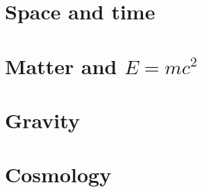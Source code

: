 \documentclass{poets}
\begin{document}
%






\tableofcontents

\mainmatter
  \addtocounter{page}{6}  %
\newcommand{\dochapter}[1]{\renewcommand{\chapdir}{ch#1}}
\part{Space and time}
    \dochapter{01}
    \dochapter{02}
    \dochapter{03}
    \dochapter{04}
\part{Matter and \boldmath $E=mc^2$}
    \dochapter{05}
    \dochapter{06}
\part{Gravity}
    \dochapter{07}
    \dochapter{08}
    \dochapter{09}
    \dochapter{10}
    \dochapter{11}
    \dochapter{12}
\part{Cosmology}
    \dochapter{13}
    \dochapter{14}



\backmatter



\printindex
\end{document}
